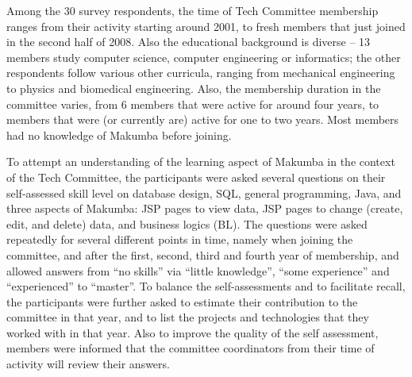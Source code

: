 \documentclass{llncs}
\begin{document}
Among the 30 survey respondents, the 
time of Tech Committee membership ranges from their activity starting around 2001, to fresh members that just joined in the second half of 2008. Also the educational background is diverse -- 13 members study computer science, computer engineering or informatics; the other respondents follow various other curricula, ranging from mechanical engineering to physics and biomedical engineering. Also, the membership duration in the committee varies, from 6 members that were active for around four years, to members that were (or currently are) active for one to two years. Most members had no knowledge of Makumba before joining.

To attempt an understanding of the learning aspect of Makumba in the context of the Tech Committee, the participants were asked several questions on their self-assessed skill level on database design, SQL, general programming, Java, and three aspects of Makumba: JSP pages to view data, JSP pages to change (create, edit, and delete) data, and business logics (BL). The questions were asked repeatedly for several different points in time, namely when joining the committee, and after the first, second, third and fourth year of membership, and allowed answers from ``no skills'' via ``little knowledge'', ``some experience'' and ``experienced'' to ``master''. To balance the self-assessments and to facilitate recall, the participants were further asked to estimate their contribution to the committee in that year, and to list the projects and technologies that they worked with in that year. Also to improve the quality of the self assessment, members were informed that the committee coordinators from their time of activity will review their answers.
\end{document}
